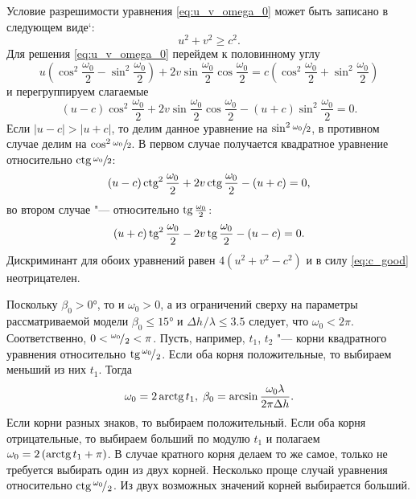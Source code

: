 \documentclass[../main.tex]{subfiles}
\begin{document}
Условие разрешимости уравнения \eqref{eq:u_v_omega_0} может быть записано в следующем виде`\cite{ABRAMOVIZ:1986}:
\begin{equation} \label{eq:c_good}
  u^2 + v^2 \geq c^2.
\end{equation}
Для решения \eqref{eq:u_v_omega_0} перейдем к половинному углу
\begin{equation*}
  u \left( \cos^2\frac{\omega_0}{2} - \sin^2\frac{\omega_0}{2} \right) + 2v \sin\frac{\omega_0}{2} \cos\frac{\omega_0}{2} =
  c \left(\cos^2\frac{\omega_0}{2} + \sin^2\frac{\omega_0}{2} \right)
\end{equation*}
и перегруппируем слагаемые
\begin{equation*}
  \left(u - c\right) \cos^2\frac{\omega_0}{2} + 2v \sin\frac{\omega_0}{2} \cos\frac{\omega_0}{2} - \left(u + c\right) \sin^2\frac{\omega_0}{2} = 0.
\end{equation*}
Если $\left|u - c\right| > \left|u + c\right|$, то делим данное уравнение на $\sin^2 \sfrac{\omega_0}{2}$, в противном случае делим на $\cos^2 \sfrac{\omega_0}{2}$. В первом случае получается квадратное уравнение относительно $\operatorname{\text{ctg}} \sfrac{\omega_0}{2}$:
\begin{equation*}
    \left(u - c\right) \operatorname{\text{ctg}}^2 \frac{\omega_0}{2} + 2v \operatorname{\text{ctg}}\frac{\omega_0}{2} - \left(u + c\right) = 0,
\end{equation*}
во втором случае "--- относительно $\operatorname{\text{tg}} \frac{\omega_0}{2}$:
\begin{equation*}
    \left(u + c\right) \operatorname{\text{tg}}^2 \frac{\omega_0}{2} - 2v \operatorname{\text{tg}} \frac{\omega_0}{2} - \left(u - c\right) = 0.
\end{equation*}
Дискриминант для обоих уравнений равен $4\left(u^2 + v^2 - c^2\right)$ и в силу \eqref{eq:c_good} неотрицателен.

Поскольку $\beta_0 > \ang{0}$, то и $\omega_0 > 0$, а из ограничений сверху на параметры рассматриваемой модели $\beta_0 \leq \ang{15}$ и $ \Delta h^{}/\lambda \leq 3.5$ следует, что $\omega_0 < 2 \pi $. Соответственно, $0 < {}^{\omega_0}\!/_{2} < \pi$. Пусть, например, $t_1$, $t_2$ "--- корни квадратного уравнения относительно $\operatorname{\text{tg}} {}^{\omega_0}\!/_{2}$. Если оба корня положительные, то выбираем меньший из них $t_1$. Тогда
\begin{equation*}
  \omega_0 = 2 \operatorname{\text{arctg}} t_1, \; \beta_0 = \arcsin \frac{\omega_0 \lambda} {2\pi \Delta h}.
\end{equation*}
Если корни разных знаков, то выбираем положительный. Если оба корня отрицательные, то выбираем больший по модулю $t_1$ и полагаем $\omega_0 = 2\left( \operatorname{\text{arctg}} t_1 + \pi\right)$. В случае кратного корня делаем то же самое, только не требуется выбирать один из двух корней.
Несколько проще случай уравнения относительно $\operatorname{\text{ctg}}{}^{\omega_0}\!/_{2}$. Из двух возможных значений корней выбирается больший.
\end{document}
